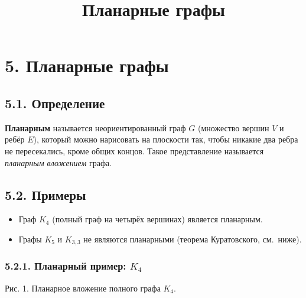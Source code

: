 \documentclass{article}
\begin{document}
\title{Планарные графы}
\author{}
\date{}
\makeatletter
\renewcommand{\maketitle}{
  \begin{center}
    {\Large\mdseries\@title\par}
    \vspace{0.5em}
  \end{center}
}
\makeatother
\maketitle

\section*{5. Планарные графы}

\subsection*{5.1. Определение}

\textbf{Планарным} называется неориентированный граф $G$ (множество вершин $V$ и ребёр $E$), который можно нарисовать на плоскости так, чтобы никакие два ребра не пересекались, кроме общих концов. Такое представление называется \emph{планарным вложением} графа.

\subsection*{5.2. Примеры}

\begin{itemize}[leftmargin=*]
  \item Граф $K_4$ (полный граф на четырёх вершинах) является планарным.
  \item Графы $K_5$ и $K_{3,3}$ не являются планарными (теорема Куратовского, см.~ниже).
\end{itemize}

\subsubsection*{5.2.1. Планарный пример: $K_4$}

\begin{center}

\small Рис. 1. Планарное вложение полного графа $K_4$.
\end{center}
\end{document}
